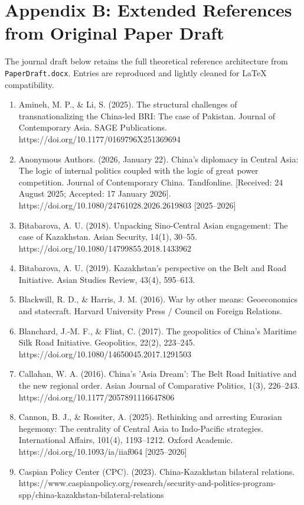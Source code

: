 \documentclass[12pt]{article}
\begin{document}
\section{Appendix B: Extended References from Original Paper Draft}
\noindent The journal draft below retains the full theoretical reference architecture from \texttt{PaperDraft.docx}. Entries are reproduced and lightly cleaned for LaTeX compatibility.

\begin{enumerate}[leftmargin=*]
\item Amineh, M. P., \& Li, S. (2025). The structural challenges of transnationalizing the China-led BRI: The case of Pakistan. Journal of Contemporary Asia. SAGE Publications. https://doi.org/10.1177/0169796X251369694
\item Anonymous Authors. (2026, January 22). China's diplomacy in Central Asia: The logic of internal politics coupled with the logic of great power competition. Journal of Contemporary China. Tandfonline. [Received: 24 August 2025; Accepted: 17 January 2026]. https://doi.org/10.1080/24761028.2026.2619803 [2025–2026]
\item Bitabarova, A. U. (2018). Unpacking Sino-Central Asian engagement: The case of Kazakhstan. Asian Security, 14(1), 30–55. https://doi.org/10.1080/14799855.2018.1433962
\item Bitabarova, A. U. (2019). Kazakhstan's perspective on the Belt and Road Initiative. Asian Studies Review, 43(4), 595–613.
\item Blackwill, R. D., \& Harris, J. M. (2016). War by other means: Geoeconomics and statecraft. Harvard University Press / Council on Foreign Relations.
\item Blanchard, J.-M. F., \& Flint, C. (2017). The geopolitics of China's Maritime Silk Road Initiative. Geopolitics, 22(2), 223–245. https://doi.org/10.1080/14650045.2017.1291503
\item Callahan, W. A. (2016). China's 'Asia Dream': The Belt Road Initiative and the new regional order. Asian Journal of Comparative Politics, 1(3), 226–243. https://doi.org/10.1177/2057891116647806
\item Cannon, B. J., \& Rossiter, A. (2025). Rethinking and arresting Eurasian hegemony: The centrality of Central Asia to Indo-Pacific strategies. International Affairs, 101(4), 1193–1212. Oxford Academic. https://doi.org/10.1093/ia/iiaf064 [2025–2026]
\item Caspian Policy Center (CPC). (2023). China-Kazakhstan bilateral relations. https://www.caspianpolicy.org/research/security-and-politics-program-spp/china-kazakhstan-bilateral-relations

\end{enumerate}
\end{document}
